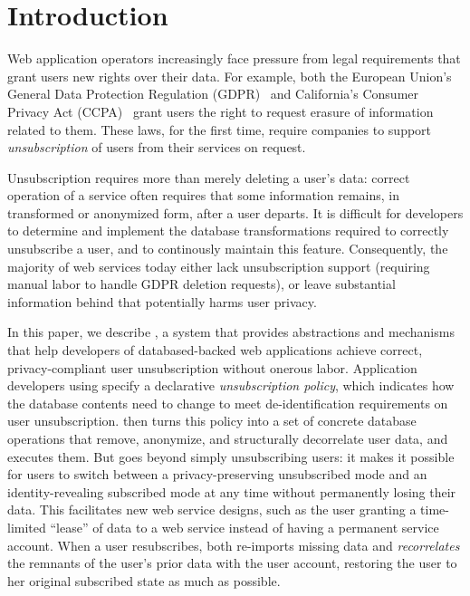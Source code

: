 \section{Introduction}

%
Web application operators increasingly face pressure from legal requirements
that grant users new rights over their data.
%
For example, both the European Union's General Data Protection Regulation
(GDPR)~\cite{eu:gdpr} and California's Consumer Privacy Act
(CCPA)~\cite{ca:privacy-act} grant users the right to request erasure of
information related to them.
%
These laws, for the first time, require companies to support \emph{unsubscription}
of users from their services on request.
%

%
Unsubscription requires more than merely deleting a user's data: correct operation
of a service often requires that some information remains, in transformed or
anonymized form, after a user departs.
%
%
It is difficult for developers to determine and implement the database
transformations required to correctly unsubscribe a user, and to continously
maintain this feature.
%
Consequently, the majority of web services today either lack unsubscription support
(requiring manual labor to handle \eg GDPR deletion requests), or leave substantial
information behind that potentially harms user privacy.
%

%
In this paper, we describe \sys, a system that provides abstractions and mechanisms
that help developers of databased-backed web applications achieve correct,
privacy-compliant user unsubscription without onerous labor.
%
Application developers using \sys specify a declarative \emph{unsubscription policy},
which indicates how the database contents need to change to meet de-identification
requirements on user unsubscription.
%
\sys then turns this policy into a set of concrete database operations that remove,
anonymize, and structurally decorrelate user data, and executes them.
%
But \sys goes beyond simply unsubscribing users: it makes it possible for users to
switch between a privacy-preserving unsubscribed mode and an
identity-revealing subscribed mode at any time without permanently losing their data.
%
This facilitates new web service designs, such as the user granting a time-limited
``lease'' of data to a web service instead of having a permanent service account.
%
When a user resubscribes, \sys both re-imports missing data and
\emph{recorrelates} the remnants of the user's prior data with the user account,
restoring the user to her original subscribed state as much as possible.
%

